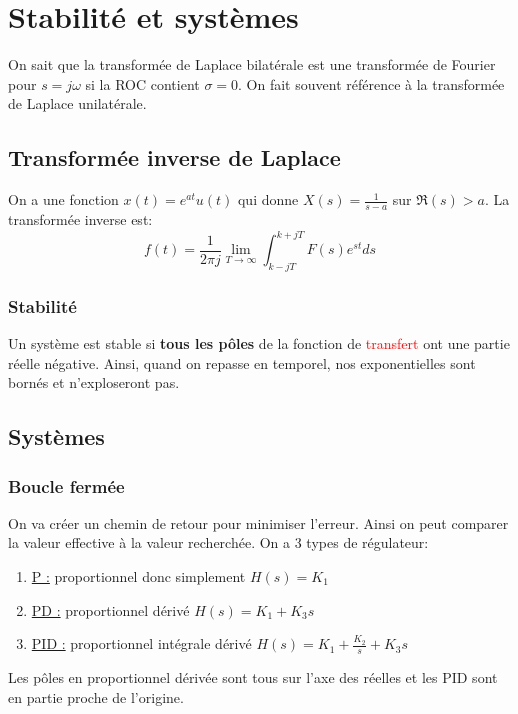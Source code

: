 \documentclass{report}
\begin{document}
\chapter{Stabilité et systèmes}
On sait que la transformée de Laplace bilatérale est une transformée de Fourier pour $s = j \omega$ si la ROC contient $\sigma = 0$. On fait souvent référence à la transformée de Laplace unilatérale.

\section{Transformée inverse de Laplace}
On a une fonction $x(t) = e^{at} u(t)$ qui donne $X(s) = \frac{1}{s-a}$ sur $\mathfrak{R}(s) >a$. La transformée inverse est:
\begin{equation}
f(t) = \frac{1}{2 \pi j} \lim_{T\rightarrow \infty} \int_{k - j T}^{k + j T} F(s) e^{st} ds
\end{equation}

\subsection{Stabilité}
Un système est stable si \textbf{tous les pôles} de la fonction de \textcolor{red}{transfert} ont une partie réelle négative.
Ainsi, quand on repasse en temporel, nos exponentielles sont bornés et n'exploseront pas.

\section{Systèmes}
\subsection{Boucle fermée}
On va créer un chemin de retour pour minimiser l'erreur. Ainsi on peut comparer la valeur effective à la valeur recherchée. On a 3 types de régulateur:
\begin{enumerate}
\item \underline{P :} proportionnel donc simplement $H(s) = K_1$
\item \underline{PD :} proportionnel dérivé $H(s) = K_1 + K_3 s$
\item \underline{PID :} proportionnel intégrale dérivé $H(s) = K_1 + \frac{K_2}{s} + K_3 s$
\end{enumerate}
Les pôles en proportionnel dérivée sont tous sur l'axe des réelles et les PID sont en partie proche de l'origine.
\end{document}
